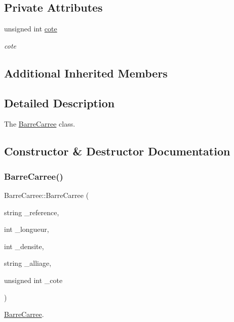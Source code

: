 \subsection*{Private Attributes}
\begin{DoxyCompactItemize}
\item 
unsigned int \hyperlink{class_barre_carree_aae1653a13278ff6701112bf3a0345208}{cote}
\begin{DoxyCompactList}\small\item\em cote \end{DoxyCompactList}\end{DoxyCompactItemize}
\subsection*{Additional Inherited Members}


\subsection{Detailed Description}
The \hyperlink{class_barre_carree}{Barre\+Carree} class. 

\subsection{Constructor \& Destructor Documentation}
\mbox{\label{class_barre_carree_ae4f158eb244b2eb6a4ba7773dfcce872}} 
\subsubsection{\texorpdfstring{Barre\+Carree()}{BarreCarree()}}
{\footnotesize\ttfamily Barre\+Carree\+::\+Barre\+Carree (\begin{DoxyParamCaption}\item[{string}]{\+\_\+reference,  }\item[{int}]{\+\_\+longueur,  }\item[{int}]{\+\_\+densite,  }\item[{string}]{\+\_\+alliage,  }\item[{unsigned int}]{\+\_\+cote }\end{DoxyParamCaption})}



\hyperlink{class_barre_carree}{Barre\+Carree}. 

